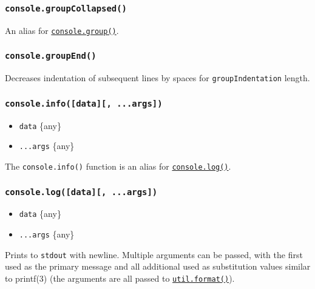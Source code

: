 \subsubsection{\texorpdfstring{\texttt{console.groupCollapsed()}}{console.groupCollapsed()}}\label{console.groupcollapsed}

An alias for \hyperref[consolegrouplabel]{\texttt{console.group()}}.

\subsubsection{\texorpdfstring{\texttt{console.groupEnd()}}{console.groupEnd()}}\label{console.groupend}

Decreases indentation of subsequent lines by spaces for
\texttt{groupIndentation} length.

\subsubsection{\texorpdfstring{\texttt{console.info({[}data{]}{[},\ ...args{]})}}{console.info({[}data{]}{[}, ...args{]})}}\label{console.infodata-...args}

\begin{itemize}
\tightlist
\item
  \texttt{data} \{any\}
\item
  \texttt{...args} \{any\}
\end{itemize}

The \texttt{console.info()} function is an alias for
\hyperref[consolelogdata-args]{\texttt{console.log()}}.

\subsubsection{\texorpdfstring{\texttt{console.log({[}data{]}{[},\ ...args{]})}}{console.log({[}data{]}{[}, ...args{]})}}\label{console.logdata-...args}

\begin{itemize}
\tightlist
\item
  \texttt{data} \{any\}
\item
  \texttt{...args} \{any\}
\end{itemize}

Prints to \texttt{stdout} with newline. Multiple arguments can be
passed, with the first used as the primary message and all additional
used as substitution values similar to printf(3) (the arguments are all
passed to
\href{util.md\#utilformatformat-args}{\texttt{util.format()}}).

